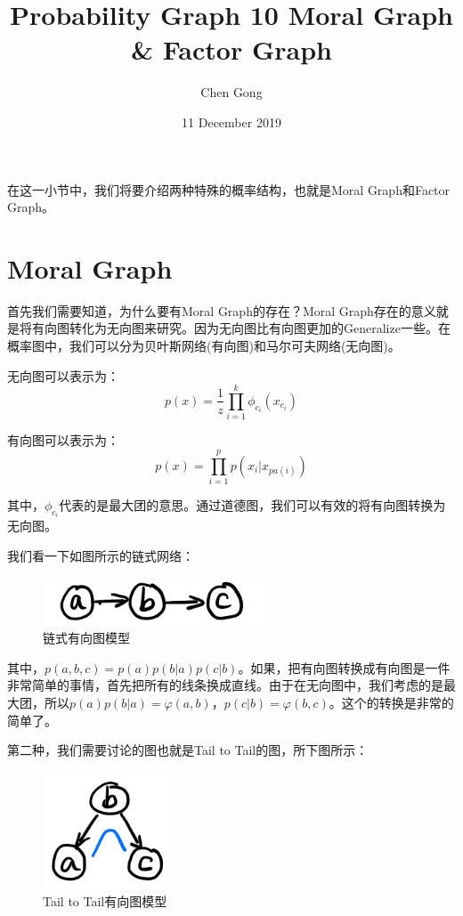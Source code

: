 \documentclass[a4paper]{article}
\title{Probability Graph 10 Moral Graph \& Factor Graph}
\author{Chen Gong}
\date{11 December 2019}
\begin{document}
\maketitle
在这一小节中，我们将要介绍两种特殊的概率结构，也就是Moral Graph和Factor Graph。

\section{Moral Graph}
首先我们需要知道，为什么要有Moral Graph的存在？Moral Graph存在的意义就是将有向图转化为无向图来研究。因为无向图比有向图更加的Generalize一些。在概率图中，我们可以分为贝叶斯网络(有向图)和马尔可夫网络(无向图)。

无向图可以表示为：
\begin{equation}
    p(x) = \frac{1}{z}\prod_{i=1}^k \phi_{c_i}(x_{c_i})
\end{equation}

有向图可以表示为：
\begin{equation}
    p(x) = \prod_{i=1}^pp(x_i|x_{pa(i)})
\end{equation}

其中，$\phi_{c_i}$代表的是最大团的意思。通过道德图，我们可以有效的将有向图转换为无向图。

我们看一下如图所示的链式网络：
\begin{figure}[H]
    \centering
    \includegraphics[width=.25\textwidth]{微信图片_20191211151651.png}
    \caption{链式有向图模型}
    \label{fig:my_label_1}
\end{figure}

其中，$p(a,b,c) = p(a)p(b|a)p(c|b)$。如果，把有向图转换成有向图是一件非常简单的事情，首先把所有的线条换成直线。由于在无向图中，我们考虑的是最大团，所以$p(a)p(b|a) = \varphi(a,b)$，$p(c|b) = \varphi(b,c)$。这个的转换是非常的简单了。

第二种，我们需要讨论的图也就是Tail to Tail的图，所下图所示：
\begin{figure}[H]
    \centering
    \includegraphics[width=.15\textwidth]{微信图片_20191211152752.png}
    \caption{Tail to Tail有向图模型}
    \label{fig:my_label_1}
\end{figure}
\end{document}
